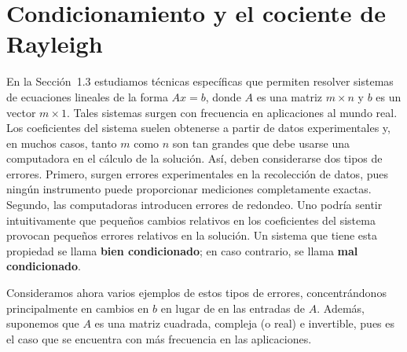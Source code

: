 \section{Condicionamiento y el cociente de Rayleigh}

En la Sección~1.3 estudiamos técnicas específicas que permiten resolver sistemas de ecuaciones lineales de la forma $Ax=b$, donde $A$ es una matriz $m\times n$ y $b$ es un vector $m\times 1$. Tales sistemas surgen con frecuencia en aplicaciones al mundo real. Los coeficientes del sistema suelen obtenerse a partir de datos experimentales y, en muchos casos, tanto $m$ como $n$ son tan grandes que debe usarse una computadora en el cálculo de la solución. Así, deben considerarse dos tipos de errores. Primero, surgen errores experimentales en la recolección de datos, pues ningún instrumento puede proporcionar mediciones completamente exactas. Segundo, las computadoras introducen errores de redondeo. Uno podría sentir intuitivamente que pequeños cambios relativos en los coeficientes del sistema provocan pequeños errores relativos en la solución. Un sistema que tiene esta propiedad se llama \textbf{bien condicionado}; en caso contrario, se llama \textbf{mal condicionado}.

Consideramos ahora varios ejemplos de estos tipos de errores, concentrándonos principalmente en cambios en $b$ en lugar de en las entradas de $A$. Además, suponemos que $A$ es una matriz cuadrada, compleja (o real) e invertible, pues es el caso que se encuentra con más frecuencia en las aplicaciones.


